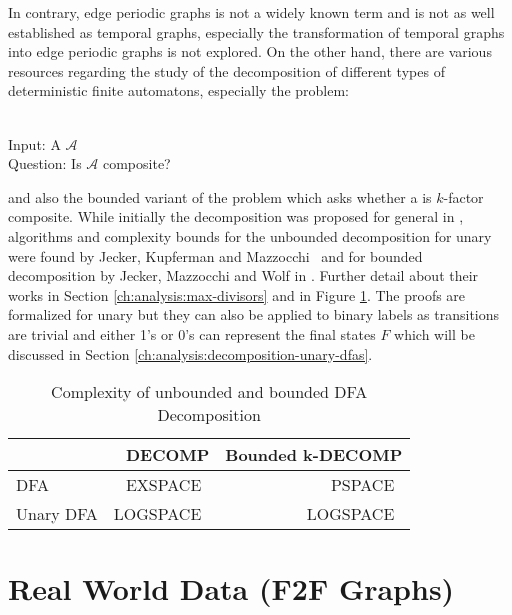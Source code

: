 In contrary, edge periodic graphs is not a widely known term and is not as well established as temporal graphs, especially the transformation of temporal graphs into edge periodic graphs is not explored. On the other hand, there are various resources regarding the study of the decomposition of different types of deterministic finite automatons, especially the problem:
\begin{defn}{\ \\}
	Input: A \DFA $\mathcal{A}$\\
	Question: Is $\mathcal{A}$ composite?
\end{defn}
and also the bounded variant of the problem which asks whether a \DFA is $k$-factor composite. While initially the decomposition was proposed for general \DFAs in \cite{prime-languages}, algorithms and complexity bounds for the unbounded decomposition for unary \DFAs were found by Jecker, Kupferman and Mazzocchi~\cite{unara-prime-languages} and for bounded decomposition by  Jecker, Mazzocchi and Wolf in \cite{DBLP:journals/corr/abs-2107-04683}. Further detail about their works in Section \ref{ch:analysis:max-divisors} and in Figure \ref{tab:dfa-decomp-complexity}. The proofs are formalized for unary \DFAs but they can also be applied to binary labels as transitions are trivial and either 1's or 0's can represent the final states $F$ which will be discussed in Section \ref{ch:analysis:decomposition-unary-dfas}.
\begin{table}[h]
	\centering
	\begin{tabular}{l|rr}
		&  DECOMP & Bounded k-DECOMP  \\
		\hline
		DFA & EXSPACE~\cite{prime-languages} & PSPACE~\cite{DBLP:journals/corr/abs-2107-04683}  \\
		Unary DFA & LOGSPACE~\cite{unara-prime-languages} &  LOGSPACE~\cite{DBLP:journals/corr/abs-2107-04683}
	\end{tabular}
	\caption{Complexity of unbounded and bounded DFA Decomposition}
	\label{tab:dfa-decomp-complexity}
\end{table}


\section{Real World Data (F2F Graphs)}
\label{ch:prelimiaries:real-world-data}

